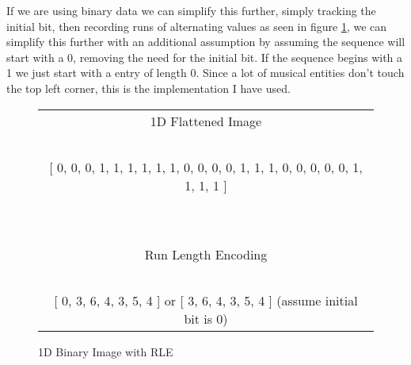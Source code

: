 If we are using binary data we can simplify this further, simply tracking the initial bit, then recording runs of alternating values as seen in figure \ref{fig:rle-1d-binary}, we can simplify this further with an additional assumption \parencite{fujinaga1996adaptive} by assuming the sequence will start with a 0, removing the need for the initial bit. If the sequence begins with a 1 we just start with a entry of length 0. Since a lot of musical entities don't touch the top left corner, this is the implementation I have used.

\begin{figure}
  \centering

  \begin{tabular}{c}

  1D Flattened Image \\
  \ \\
  {[} 0, 0, 0, 1, 1, 1, 1, 1, 1, 0, 0, 0, 0, 1, 1, 1, 0, 0, 0, 0, 0, 1, 1, 1, 1 {]} \\
  \ \\
  \hline
  \ \\
  Run Length Encoding \\
  \ \\
  {[} 0, 3, 6, 4, 3, 5, 4 {]} or {[} 3, 6, 4, 3, 5, 4 {]} (assume initial bit is 0) \\
  \end{tabular}
  \caption{1D Binary Image with RLE}
  \label{fig:rle-1d-binary}
\end{figure}
